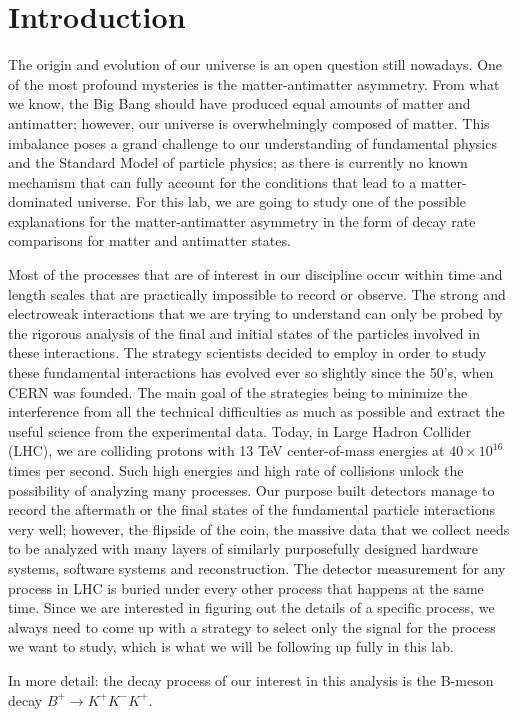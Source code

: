 \chapter*{Introduction}

The origin and evolution of our universe is an open question still nowadays. One of the most profound mysteries is the matter-antimatter asymmetry. From what we know, the Big Bang should have produced equal amounts of matter and antimatter; however, our universe is overwhelmingly composed of matter. This imbalance poses a grand challenge to our understanding of fundamental physics and the Standard Model of particle physics; as there is currently no known mechanism that can fully account for the conditions that lead to a matter-dominated universe. For this lab, we are going to study one of the possible explanations for the matter-antimatter asymmetry in the form of decay rate comparisons for matter and antimatter states.

Most of the processes that are of interest in our discipline occur within time and length scales that are practically impossible to record or observe. The strong and electroweak interactions that we are trying to understand can only be probed by the rigorous analysis of the final and initial states of the particles involved in these interactions. The strategy scientists decided to employ in order to study these fundamental interactions has evolved ever so slightly since the 50's, when CERN was founded. The main goal of the strategies being to minimize the interference from all the technical difficulties as much as possible and extract the useful science from the experimental data. Today, in Large Hadron Collider (LHC), we are colliding protons with 13 TeV center-of-mass energies at \( 40 \times 10^{16} \) times per second. Such high energies and high rate of collisions unlock the possibility of analyzing many processes. Our purpose built detectors manage to record the aftermath or the final states of the fundamental particle interactions very well; however, the flipside of the coin, the massive data that we collect needs to be analyzed with many layers of similarly purposefully designed hardware systems, software systems and reconstruction. The detector measurement for any process in LHC is buried under every other process that happens at the same time. Since we are interested in figuring out the details of a specific process, we always need to come up with a strategy to select only the signal for the process we want to study, which is what we will be following up fully in this lab.

In more detail: the decay process of our interest in this analysis is the B-meson decay $B^+ \rightarrow K^+ K^- K^+$.

